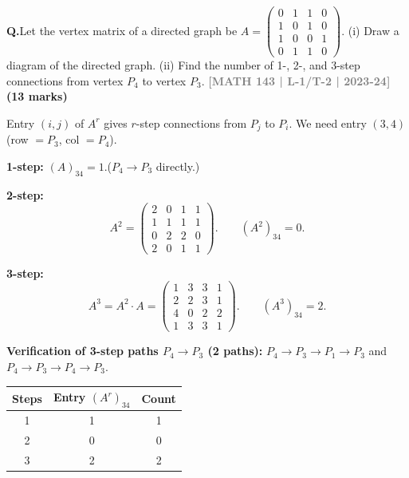 \documentclass[12pt,a3paper]{article}
\newcommand{\yr}[1]{\hfill\textcolor{gray}{\small\textbf{[#1]}}}
\newcommand{\mk}[1]{\textcolor{orange!70!black}{\small\textbf{(#1 marks)}}}
\newcounter{qnum}
\newcommand{\Q}[1]{%
  \needspace{4\baselineskip}
  \refstepcounter{qnum}
  \vspace{6pt}
  \noindent\textbf{Q\theqnum.}\enspace #1\par
}
\begin{document}
\Q{Let the vertex matrix of a directed graph be $A = \begin{pmatrix} 0 & 1 & 1 & 0 \\ 1 & 0 & 1 & 0 \\ 1 & 0 & 0 & 1 \\ 0 & 1 & 1 & 0 \end{pmatrix}$. (i) Draw a diagram of the directed graph. (ii) Find the number of 1-, 2-, and 3-step connections from vertex $P_4$ to vertex $P_3$.
\yr{MATH 143 | L-1/T-2 | 2023-24} \mk{13}}
\begin{tcolorbox}[enhanced,breakable,
  colback=cA!4,colframe=cA,boxrule=0.8pt,arc=5pt,
  title={\textbf{Answer --- $r$-Step Connections $P_4\to P_3$
    for $A=\begin{pmatrix}0&1&1&0\\1&0&1&0\\1&0&0&1\\0&1&1&0\end{pmatrix}$}},
  fonttitle=\bfseries\color{white},colbacktitle=cA]

Entry $(i,j)$ of $A^r$ gives $r$-step connections from $P_j$ to $P_i$.
We need entry $(3,4)$ (row $=P_3$, col $=P_4$).

\textbf{1-step:} $(A)_{34} = 1$.\quad ($P_4\to P_3$ directly.) \checkmark

\textbf{2-step:}
\[
  A^2 = \begin{pmatrix}2&0&1&1\\1&1&1&1\\0&2&2&0\\2&0&1&1\end{pmatrix}.
  \qquad (A^2)_{34} = 0.
\]

\textbf{3-step:}
\[
  A^3 = A^2\cdot A = \begin{pmatrix}1&3&3&1\\2&2&3&1\\4&0&2&2\\1&3&3&1\end{pmatrix}.
  \qquad (A^3)_{34} = 2.
\]

\textbf{Verification of 3-step paths $P_4\to P_3$ (2 paths):}
$P_4\to P_3\to P_1\to P_3$ and $P_4\to P_3\to P_4\to P_3$.

\begin{center}
\begin{tabular}{ccc}
\toprule
Steps & Entry $(A^r)_{34}$ & Count \\
\midrule
1 & 1 & 1 \\
2 & 0 & 0 \\
3 & 2 & 2 \\
\bottomrule
\end{tabular}
\end{center}

\end{tcolorbox}
 
\end{document}
